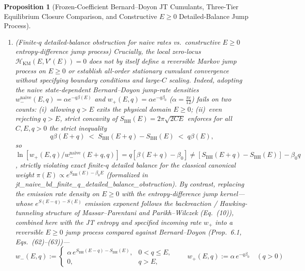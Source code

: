 \documentclass[11pt,a4paper]{article}
\newtheorem{proposition}{Proposition}
\theoremstyle{definition}
\theoremstyle{remark}
\newcommand{\1}{\mathbf{1}}
\newcommand{\code}[1]{{\scriptsize\ttfamily #1}}
\begin{document}
\begin{proposition}[Frozen-Coefficient Bernard--Doyon JT Cumulants, Three-Tier Equilibrium Closure Comparison, and Constructive $E\ge 0$ Detailed-Balance Jump Process]
\begin{enumerate}
  \item[(c)] \emph{(Finite-$q$ detailed-balance obstruction for naive rates vs.\ constructive $E\ge 0$ entropy-difference jump process)} Crucially, the local zero-locus $\mathcal{H}_{\mathrm{KM}}(E,V'(E))=0$ does \emph{not} by itself define a reversible Markov jump process on $E\ge 0$ or establish all-order stationary cumulant convergence without specifying boundary conditions and large-$C$ scaling. Indeed, adopting the naive state-dependent Bernard--Doyon jump-rate densities $w_-^{\mathrm{naive}}(E,q)=\alpha e^{-q\beta(E)}$ and $w_+(E,q)=\alpha e^{-q\beta_0}$ ($\alpha=\frac{\pi c}{12}$) fails on two counts: (i)~allowing $q>E$ exits the physical domain $E\ge 0$; (ii)~even rejecting $q>E$, strict concavity of $S_{\mathrm{BH}}(E)=2\pi\sqrt{2CE}$ enforces for all $C,E,q>0$ the strict inequality
  \begin{equation}\label{eq:naive-db-obstruction}
    q\beta(E+q) \;<\; S_{\mathrm{BH}}(E+q) - S_{\mathrm{BH}}(E) \;<\; q\beta(E),
  \end{equation}
  so $\ln[w_+(E,q)/w_-^{\mathrm{naive}}(E+q,q)] = q[\beta(E+q)-\beta_0] \neq [S_{\mathrm{BH}}(E+q)-S_{\mathrm{BH}}(E)]-\beta_0 q$, strictly violating exact finite-$q$ detailed balance for the classical canonical weight $\pi(E)\propto e^{S_{\mathrm{BH}}(E)-\beta_0 E}$ (formalized in \code{jt\_\allowbreak naive\_\allowbreak bd\_\allowbreak finite\_\allowbreak q\_\allowbreak detailed\_\allowbreak balance\_\allowbreak obstruction}). By contrast, replacing the emission rate density on $E\ge 0$ with the \emph{entropy-difference jump kernel}---whose $e^{S(E-q)-S(E)}$ emission exponent follows the backreaction / Hawking-tunneling structure of Massar--Parentani \cite{MassarParentani2000} and Parikh--Wilczek \cite{ParikhWilczek2000} (Eq.~(10)), combined here with the JT entropy and specified incoming rate $w_+$ into a reversible $E\ge 0$ jump process compared against Bernard--Doyon \cite{BernardDoyon2015} (Prop.~6.1, Eqs.~(62)--(63))---
  \begin{equation}\label{eq:ediff-jump-kernel}
    w_-(E,q) := \begin{cases}\alpha\,e^{S_{\mathrm{BH}}(E-q)-S_{\mathrm{BH}}(E)}, & 0 < q \le E, \\ 0, & q > E,\end{cases}
    \qquad
    w_+(E,q) := \alpha\,e^{-q\beta_0} \quad (q>0)
  \end{equation}

\end{enumerate}
\end{proposition}
\end{document}
